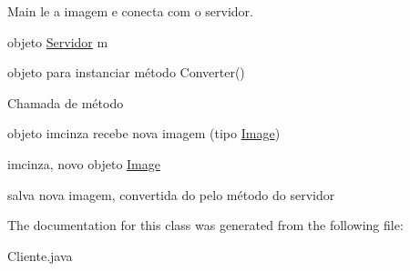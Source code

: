 Main le a imagem e conecta com o servidor. 

objeto \hyperlink{interfaceServidor}{Servidor} m

objeto para instanciar método Converter()

Chamada de método

objeto imcinza recebe nova imagem (tipo \hyperlink{classImage}{Image})

imcinza, novo objeto \hyperlink{classImage}{Image}

salva nova imagem, convertida do pelo método do servidor

The documentation for this class was generated from the following file\-:\begin{DoxyCompactItemize}
\item 
Cliente.\-java\end{DoxyCompactItemize}
